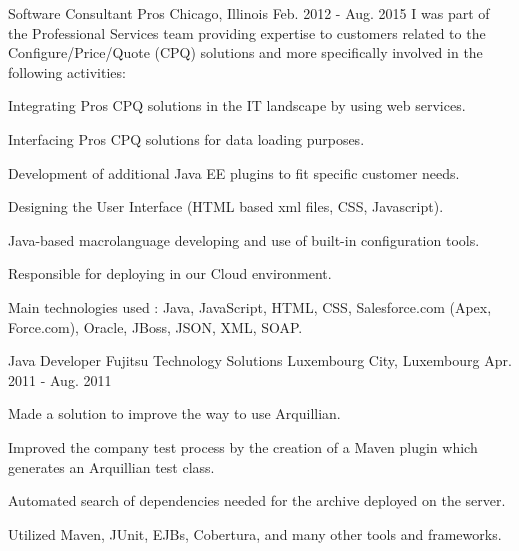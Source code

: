 \begin{cventries}
  \cventryfive
    {Software Consultant} %
    {Pros} %
    {Chicago, Illinois} %
    {Feb. 2012 - Aug. 2015} %
    {I was part of the Professional Services team providing expertise to customers related to the
Configure/Price/Quote (CPQ) solutions and more specifically involved in the following activities:}
    {
      \begin{cvitems} %
        	\item Integrating Pros CPQ solutions in the IT landscape by using web services.
		\item Interfacing Pros CPQ solutions for data loading purposes.
		\item Development of additional Java EE plugins to fit specific customer needs.
    		\item Designing the User Interface (HTML based xml files, CSS, Javascript).
    		\item Java-based macrolanguage developing and use of built-in configuration tools.
    		\item Responsible for deploying in our Cloud environment.
    		\item Main technologies used : Java, JavaScript, HTML, CSS, Salesforce.com (Apex, Force.com), Oracle, JBoss, JSON, XML, SOAP.
      \end{cvitems}
    }
    
  \cventry
    {Java Developer} %
    {Fujitsu Technology Solutions} %
    {Luxembourg City, Luxembourg} %
    {Apr. 2011 - Aug. 2011} %
    {
      \begin{cvitems} %
        	\item Made a solution to improve the way to use Arquillian.
		\item Improved the company test process by the creation of a Maven plugin which generates an Arquillian test class.
		\item Automated search of dependencies needed for the archive deployed on the server.
    		\item Utilized Maven, JUnit, EJBs, Cobertura, and many other tools and frameworks.
      \end{cvitems}
    }

\end{cventries}
